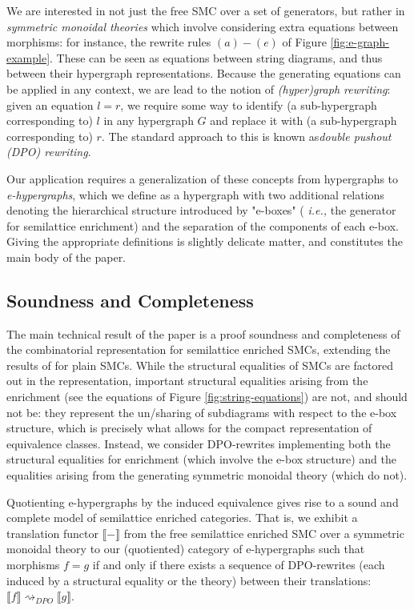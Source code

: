 We are interested in not just the free SMC over a set of generators, but rather in \textit{symmetric monoidal theories} which involve considering extra equations between morphisms: for instance, the rewrite rules $(a)-(e)$ of Figure \ref{fig:e-graph-example}. These can be seen as equations between string diagrams, and thus between their hypergraph representations.  Because the generating equations can be applied in any context, we are lead to the notion of \textit{(hyper)graph rewriting}: given an equation $l=r$, we require some way to identify (a sub-hypergraph corresponding to) $l$ in any hypergraph $G$ and replace it with (a sub-hypergraph corresponding to) $r$.
The standard approach to this is known as\textit{double pushout (DPO) rewriting}. 

Our application requires a generalization of these concepts from hypergraphs to \textit{e-hypergraphs}, which we define as a hypergraph with two additional relations denoting the hierarchical structure introduced by "e-boxes" ( \textit{i.e.,} the generator for semilattice enrichment) and the separation of the components of each e-box.
Giving the appropriate definitions is slightly delicate matter, and constitutes the main body of the paper. 

\subsection*{Soundness and Completeness}
The main technical result of the paper is a proof soundness and completeness of the combinatorial representation for semilattice enriched SMCs, extending the results of \cite{bonchi_string_2022-2} for plain SMCs. While the structural equalities of SMCs are factored out in the representation,  important structural equalities arising from the enrichment (see the equations of Figure \ref{fig:string-equations}) are not, and should not be: they represent the un/sharing of subdiagrams with respect to the e-box structure,  which is precisely what allows for the compact representation of equivalence classes.  Instead, we consider DPO-rewrites implementing both the structural equalities for enrichment (which involve the e-box structure) and the equalities arising from the generating symmetric monoidal theory (which do not).  

Quotienting e-hypergraphs by the induced equivalence gives rise to a sound and complete model of semilattice enriched categories.  That is, we exhibit a translation functor $\llbracket-\rrbracket$ from the free semilattice enriched SMC over a symmetric monoidal theory to our (quotiented) category of e-hypergraphs such that 
morphisms $f = g$ if and only if there exists a sequence of DPO-rewrites (each induced by a structural equality or the theory) between their translations: $\llbracket f \rrbracket \rightsquigarrow_{DPO} \llbracket g \rrbracket$. 

